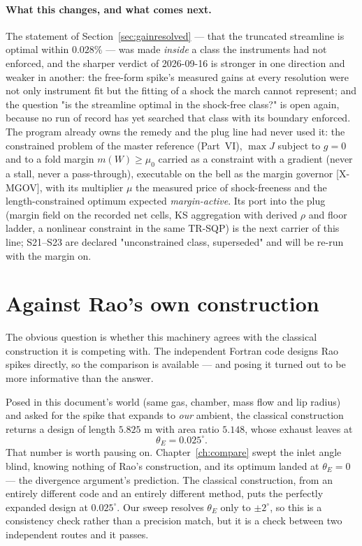 \paragraph{What this changes, and what comes next.} The statement of
Section~\ref{sec:gainresolved} --- that the truncated streamline is
optimal within $0.028\%$ --- was made \emph{inside} a class the
instruments had not enforced, and the sharper verdict of 2026-09-16
is stronger in one direction and weaker in another: the free-form
spike's measured gains at every resolution were not only instrument
fit but the fitting of a shock the march cannot represent; and the
question "is the streamline optimal in the shock-free class?" is
open again, because no run of record has yet searched that class
with its boundary enforced. The program already owns the remedy and
the plug line had never used it: the constrained problem of the
master reference (Part~VI), $\max J$ subject to $g = 0$ and to a
fold margin $m(W) \ge \mu_0$ carried as a constraint with a gradient
(never a stall, never a pass-through), executable on the bell as the
margin governor [X-MGOV], with its multiplier $\mu$ the measured
price of shock-freeness and the length-constrained optimum expected
\emph{margin-active}. Its port into the plug (margin field on the
recorded net cells, KS aggregation with derived $\rho$ and floor
ladder, a nonlinear constraint in the same TR-SQP) is the next
carrier of this line; S21--S23 are declared "unconstrained class,
superseded" and will be re-run with the margin on.

\section{Against Rao's own construction}
\label{sec:vsrao}

The obvious question is whether this machinery agrees with the
classical construction it is competing with. The independent Fortran
code designs Rao spikes directly, so the comparison is available ---
and posing it turned out to be more informative than the answer.

Posed in this document's world (same gas, chamber, mass flow and lip
radius) and asked for the spike that expands to \emph{our} ambient,
the classical construction returns a design of length $5.825$ m with
area ratio $5.148$, whose exhaust leaves at
\begin{equation}
  \theta_E = 0.025^{\circ}.
\end{equation}
That number is worth pausing on. Chapter~\ref{ch:compare} swept the
inlet angle blind, knowing nothing of Rao's construction, and its
optimum landed at $\theta_E = 0$ --- the divergence argument's
prediction. The classical construction, from an entirely different
code and an entirely different method, puts the perfectly expanded
design at $0.025^{\circ}$. Our sweep resolves $\theta_E$ only to
$\pm 2^{\circ}$, so this is a consistency check rather than a
precision match, but it is a check between two independent routes and
it passes.

